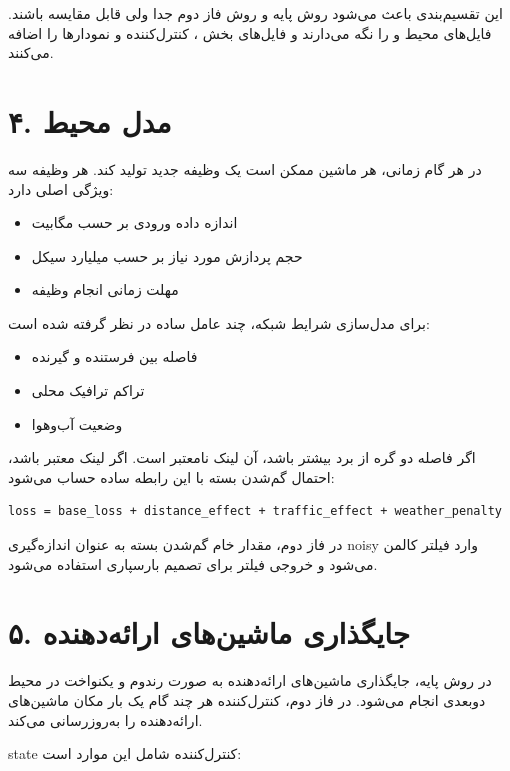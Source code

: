 \documentclass[12pt]{exam}
\begin{document}
\begin{questions}
این تقسیم‌بندی باعث می‌شود روش پایه و روش فاز دوم جدا ولی قابل مقایسه باشند.
فایل‌های  محیط و  را نگه می‌دارند و فایل‌های
 بخش ، کنترل‌کننده  و نمودارها را اضافه می‌کنند.

\section*{۴. مدل محیط}
در هر گام زمانی، هر ماشین ممکن است یک وظیفه جدید تولید کند. هر وظیفه سه ویژگی اصلی
دارد:

\begin{itemize}
\item اندازه داده ورودی بر حسب مگابیت
\item حجم پردازش مورد نیاز بر حسب میلیارد سیکل
\item مهلت زمانی انجام وظیفه
\end{itemize}

برای مدل‌سازی شرایط شبکه، چند عامل ساده در نظر گرفته شده است:

\begin{itemize}
\item فاصله بین فرستنده و گیرنده
\item تراکم ترافیک محلی
\item وضعیت آب‌وهوا
\end{itemize}

اگر فاصله دو گره از برد بیشتر باشد، آن لینک نامعتبر است. اگر لینک معتبر باشد،
احتمال گم‌شدن بسته با این رابطه ساده حساب می‌شود:

\begin{latin}
\begin{lstlisting}
loss = base_loss + distance_effect + traffic_effect + weather_penalty
\end{lstlisting}
\end{latin}

در فاز دوم، مقدار خام گم‌شدن بسته به عنوان اندازه‌گیری noisy وارد فیلتر کالمن
می‌شود و خروجی فیلتر برای تصمیم بارسپاری استفاده می‌شود.

\section*{۵. جایگذاری ماشین‌های ارائه‌دهنده}
در روش پایه، جایگذاری ماشین‌های ارائه‌دهنده به صورت رندوم و یکنواخت در محیط
دوبعدی انجام می‌شود. در فاز دوم، کنترل‌کننده  هر چند گام یک بار مکان
ماشین‌های ارائه‌دهنده را به‌روزرسانی می‌کند.

state کنترل‌کننده شامل این موارد است:


\end{questions}
\end{document}

